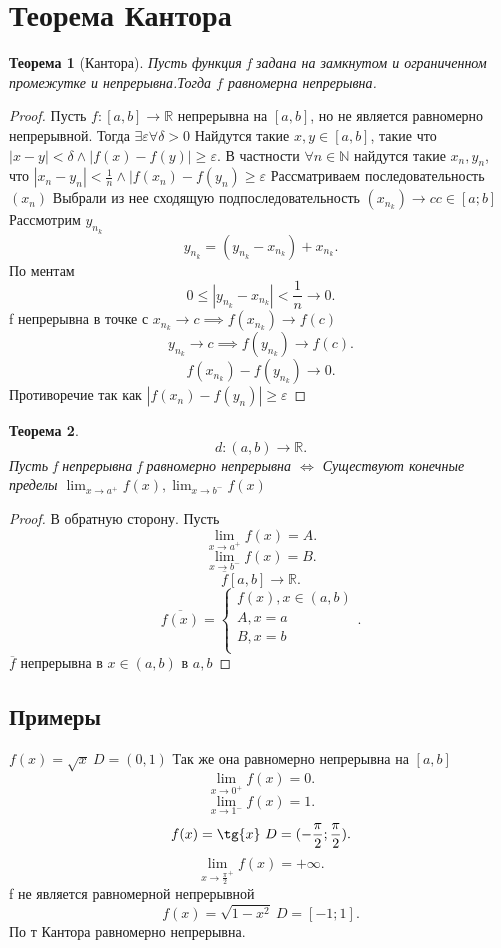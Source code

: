 \documentclass{scrartcl}
\newtheorem{theorem}{Теорема}
\begin{document}
\section{Теорема Кантора}
\begin{theorem}[Кантора]
	Пусть функция f задана на замкнутом и ограниченном промежутке и непрерывна.Тогда $f$ равномерна непрерывна.
\end{theorem}
\begin{proof}
	Пусть $f:[a,b] \to \mathbb{R}$ непрерывна на $[a,b]$, но не является равномерно непрерывной.
	Тогда $\exists  \varepsilon \forall  \delta >0$
	Найдутся такие $x,y \in[a,b]$, такие что  $|x - y| < \delta \land |f(x) - f(y)| \ge \varepsilon$.
	В частности $\forall  n \in \mathbb{N}$ найдутся такие $x_{n},y_{n}$,
	что $|x_{n} - y_{n}| < \frac{1}{n} \land |f(x_{n}) - f(y_{n}) \ge  \varepsilon$
	Рассматриваем последовательность $(x_{n})$ Выбрали из нее сходящую подпоследовательность $(x_{n_{k}}) \to c c \in [a;b]$
	Рассмотрим $y_{n_{k}}$
	\[
		y_{n_{k}} = (y_{n_{k}} - x_{n_{k}}) + x_{n_{k}}
		.\]
	По ментам
	\[
		0 \le  |y_{n_{k}} - x_{n_{k}}| <\frac{1}{n} \to 0
		.\]
	f непрерывна в точке с $x_{n_{k}} \to c \implies f(x_{n_{k}}) \to f(c)$
	\[
		y_{n_{k}} \to c \implies  f(y_{n_{k}}) \to f(c)
		.\]
	\[
		f(x_{n_{k}}) - f(y_{n_{k}}) \to 0
		.\]
	Противоречие так как $|f(x_{n})  - f(y_{n})| \ge  \varepsilon$
\end{proof}
\begin{theorem}
	\[
		d : (a,b) \to \mathbb{R}
		.\]
	Пусть f непрерывна  f равномерно непрерывна $\iff$
	Существуют конечные пределы   $\lim_{x \to a^{+}} f(x) ,
		\lim_{x \to b^{-}}f(x) $
\end{theorem}
\begin{proof}
	В обратную сторону. Пусть
	\[
		\lim_{x \to a^{+}}  f(x) = A
		.\]
	\[
		\lim_{x \to b^{-}}  f(x) = B
		.\]
	\[
		\overline{f} [a,b] \to \mathbb{R}
		.\]
	\[
		\overline{f(x)} =
		\begin{cases}
			f(x), x \in (a,b) \\
			A , x = a         \\
			B, x = b          \\
		\end{cases}
		.\]
	$\overline{f}$ непрерывна в $x \in (a,b)$ в  $a,b$
\end{proof}
\subsection{Примеры}
$f(x) = \sqrt{x} ~ D = (0,1) $ Так же она равномерно непрерывна на $[a,b]$
\[
	\lim_{x \to 0^{+}} f(x) = 0
	.\]
\[
	\lim_{x \to 1^{-}} f(x) = 1
	.\]
\[
	f(x) = \tg{x} ~ D = (-\frac{\pi}{2}; \frac{\pi}{2})
	.\]
\[
	\lim_{x \to \frac{\pi}{2}^{+} }f(x)  = +\infty
	.\]
f не является равномерной непрерывной\\
\[
	f(x) = \sqrt{1 - x^2}  ~D = [-1;1]
	.\]
По т Кантора равномерно непрерывна.
\end{document}
